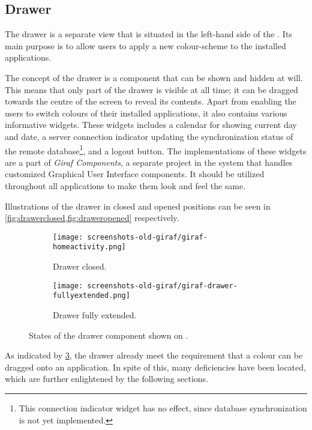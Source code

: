 \subsection{Drawer}\label{sec:launcher:drawer}
The drawer is a separate view that is situated in the left-hand side of the \homeactivity.
Its main purpose is to allow \launcher users to apply a new colour-scheme to the installed \giraf applications.

The concept of the drawer is a component that can be shown and hidden at will.
This means that only part of the drawer is visible at all time; it can be dragged towards the centre of the screen to reveal its contents.
Apart from enabling the users to switch colours of their installed \giraf applications, it also contains various informative widgets.
These widgets includes a calendar for showing current day and date, a server connection indicator updating the synchronization status of the remote database\footnote{This connection indicator widget has no effect, since database synchronization is not yet implemented.}, and a logout button.
The implementations of these widgets are a part of \textit{Giraf Components}, a separate project in the \giraf system that handles customized Graphical User Interface components.
It should be utilized throughout all \giraf applications to make them look and feel the same.

Illustrations of the drawer in closed and opened positions can be seen in \cref{fig:drawerclosed,fig:draweropened} respectively.

\begin{figure}[h] %
\centering
	\begin{subfigure}[b]{.48\textwidth}
	\centering
	\texttt{[image: screenshots-old-giraf/giraf-homeactivity.png]}
	\caption{Drawer closed.}
	\label{fig:drawerclosed}
	\end{subfigure}
	\hfill
	\begin{subfigure}[b]{.48\textwidth}
	\centering
	\texttt{[image: screenshots-old-giraf/giraf-drawer-fullyextended.png]}
	\caption{Drawer fully extended.}
	\label{fig:draweropened}
	\end{subfigure}
\caption{States of the drawer component shown on \homeactivity.}
\label{fig:drawerstates}
\end{figure}

As indicated by \cref{fig:drawerstates}, the drawer already meet the requirement that a colour can be dragged onto an application.
In spite of this, many deficiencies have been located, which are further enlightened by the following sections.

